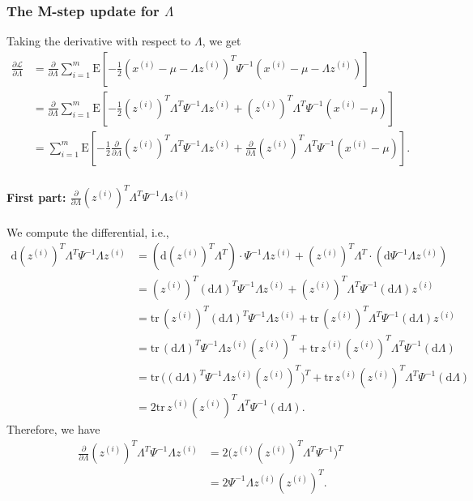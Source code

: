 \documentclass{article}
\begin{document}
\subsubsection{The M-step update for $\Lambda$}

Taking the derivative with respect to $\Lambda$, we get
\[
\begin{split}
\frac{\partial \mathcal{L}}{\partial\Lambda}
&=\frac{\partial }{\partial\Lambda}
\sum_{i=1}^m \text{E}\left[-\frac{1}{2}(x^{(i)}-\mu-\Lambda z^{(i)})^T\Psi^{-1}(x^{(i)}-\mu-\Lambda z^{(i)})\right]\\
&=\frac{\partial }{\partial\Lambda}
\sum_{i=1}^m \text{E}\left[-\frac{1}{2}(z^{(i)})^T\Lambda^T\Psi^{-1}\Lambda z^{(i)}+(z^{(i)})^T\Lambda^T\Psi^{-1}(x^{(i)}-\mu)\right]\\
&=\sum_{i=1}^m \text{E}\left[-\frac{1}{2}\frac{\partial }{\partial\Lambda}(z^{(i)})^T\Lambda^T\Psi^{-1}\Lambda z^{(i)}
+\frac{\partial }{\partial\Lambda}(z^{(i)})^T\Lambda^T\Psi^{-1}(x^{(i)}-\mu)\right].
\end{split}
\]
\paragraph{First part: $\frac{\partial }{\partial\Lambda}(z^{(i)})^T\Lambda^T\Psi^{-1}\Lambda z^{(i)}$} We compute the differential, i.e.,
\[
\begin{split}
\text{d}(z^{(i)})^T\Lambda^T\Psi^{-1}\Lambda z^{(i)}
&=(\text{d}(z^{(i)})^T\Lambda^T)\cdot\Psi^{-1}\Lambda z^{(i)}+(z^{(i)})^T\Lambda^T\cdot(\text{d}\Psi^{-1}\Lambda z^{(i)})\\
&=(z^{(i)})^T(\text{d}\Lambda)^T\Psi^{-1}\Lambda z^{(i)}+(z^{(i)})^T\Lambda^T\Psi^{-1}(\text{d}\Lambda) z^{(i)}\\
&=\text{tr}\,(z^{(i)})^T(\text{d}\Lambda)^T\Psi^{-1}\Lambda z^{(i)}
+\text{tr}\,(z^{(i)})^T\Lambda^T\Psi^{-1}(\text{d}\Lambda) z^{(i)}\\
&=\text{tr}\,(\text{d}\Lambda)^T\Psi^{-1}\Lambda z^{(i)}(z^{(i)})^T
+\text{tr}\, z^{(i)}(z^{(i)})^T\Lambda^T\Psi^{-1}(\text{d}\Lambda)\\
&=\text{tr}\,\big((\text{d}\Lambda)^T\Psi^{-1}\Lambda z^{(i)}(z^{(i)})^T\big)^T
+\text{tr}\, z^{(i)}(z^{(i)})^T\Lambda^T\Psi^{-1}(\text{d}\Lambda)\\
&=2\text{tr}\, z^{(i)}(z^{(i)})^T\Lambda^T\Psi^{-1}(\text{d}\Lambda).
\end{split}
\]
Therefore, we have
\[
\begin{split}
\frac{\partial }{\partial\Lambda}(z^{(i)})^T\Lambda^T\Psi^{-1}\Lambda z^{(i)}
&=2\big(z^{(i)}(z^{(i)})^T\Lambda^T\Psi^{-1}\big)^T\\
&=2\Psi^{-1}\Lambda z^{(i)}(z^{(i)})^T.
\end{split}
\]
\end{document}
